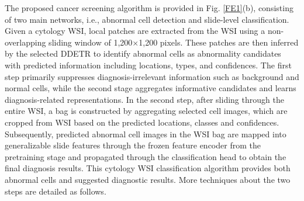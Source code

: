 The proposed cancer screening algorithm is provided in Fig. \ref{FE1}(b), consisting of two main networks, i.e., abnormal cell detection and slide-level classification. Given a cytology WSI, local patches are extracted from the WSI using a non-overlapping sliding window of 1,200$\times$1,200 pixels. 
These patches are then inferred by the selected DDETR \cite{zhu2020deformable} to identify abnormal cells as abnormality candidates with predicted information including locations, types, and confidences. The first step primarily suppresses diagnosis-irrelevant information such as background and normal cells, while the second stage aggregates informative candidates and learns diagnosis-related representations. In the second step, after sliding through the entire WSI, a bag is constructed by aggregating selected cell images, which are cropped from WSI based on the predicted locations, classes and confidences. Subsequently, predicted abnormal cell images in the WSI bag are mapped into generalizable slide features through the frozen feature encoder from the pretraining stage and propagated through the classification head to obtain the final diagnosis results. 
This cytology WSI classification algorithm provides both abnormal cells and suggested diagnostic results. More techniques about the two steps are detailed as follows.

